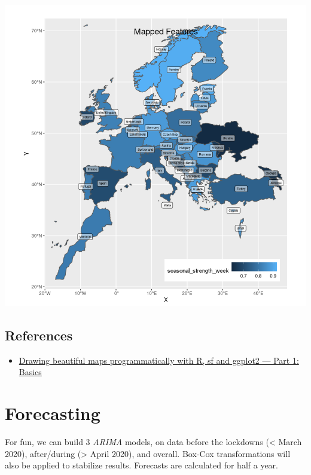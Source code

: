 \documentclass[8pt]{article}
\begin{document}
\begin{center}
\includegraphics[width=.9\linewidth]{./media/feat_gis.png}
\end{center}

\subsection{References}
\label{sec:org38c36f2}
\begin{itemize}
\item \href{https://r-spatial.org/r/2018/10/25/ggplot2-sf.html}{Drawing beautiful maps programmatically with R, sf and ggplot2 — Part 1: Basics}

\begin{latex}
\pagebreak
\end{latex}
\end{itemize}
\section{Forecasting}
\label{sec:org5b6219c}

For fun, we can build 3 \emph{ARIMA} models, on data before the lockdowns (< March 2020), after/during (> April 2020), and overall. Box-Cox transformations will also be applied to stabilize results. Forecasts are calculated for half a year.
\end{document}
